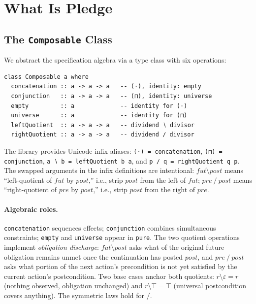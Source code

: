 \documentclass[acmsmall,screen]{acmart}
\newcommand{\pre}{\mathit{pre}}
\newcommand{\post}{\mathit{post}}
\newcommand{\fut}{\mathit{fut}}
\newcommand{\lquot}{\mathbin{\setminus}}   %
\newcommand{\rquot}{\mathbin{/}}           %
\begin{document}
\section{What Is Pledge}
\label{sec:pledge}

\subsection{The \texttt{Composable} Class}
\label{sec:composable}

We abstract the specification algebra via a type class with six operations:
\begin{lstlisting}
class Composable a where
  concatenation :: a -> a -> a   -- (·), identity: empty
  conjunction   :: a -> a -> a   -- (⊓), identity: universe
  empty         :: a             -- identity for (·)
  universe      :: a             -- identity for (⊓)
  leftQuotient  :: a -> a -> a   -- dividend ∖ divisor
  rightQuotient :: a -> a -> a   -- dividend ∕ divisor
\end{lstlisting}
The library provides Unicode infix aliases:
\lstinline{(·) = concatenation},
\lstinline{(⊓) = conjunction},
\lstinline{a ∖ b = leftQuotient b a}, and
\lstinline{p ∕ q = rightQuotient q p}.
The swapped arguments in the infix definitions are intentional:
$\fut \lquot \post$ means ``left-quotient of $\fut$ by $\post$,'' i.e.,
strip $\post$ from the left of $\fut$;
$\pre \rquot \post$ means ``right-quotient of $\pre$ by $\post$,''
i.e., strip $\post$ from the right of $\pre$.

\paragraph{Algebraic roles.}
\lstinline{concatenation} sequences effects;
\lstinline{conjunction} combines simultaneous constraints;
\lstinline{empty} and \lstinline{universe} appear in \lstinline{pure}.
The two quotient operations implement \emph{obligation discharge}:
$\fut \lquot \post$ asks what of the original future obligation remains
unmet once the continuation has posted $\post$, and $\pre \rquot \post$
asks what portion of the next action's precondition is not yet satisfied
by the current action's postcondition.
Two base cases anchor both quotients:
$r \lquot \varepsilon = r$ (nothing observed, obligation unchanged) and
$r \lquot \top = \top$ (universal postcondition covers anything).
The symmetric laws hold for $\rquot$.
\end{document}
